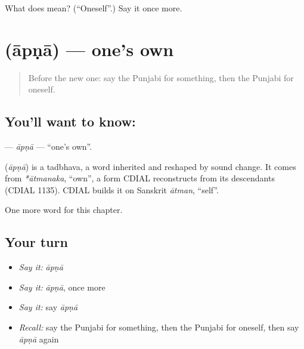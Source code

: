 \begin{tcolorbox}[breakable,colback=teal!4,colframe=teal!35!black,title={Before you move on}]
What does  mean? (\textquotedblleft{}Oneself\textquotedblright{}.) Say it once more.
\end{tcolorbox}
\section[\texorpdfstring{\pa{ਆਪਣਾ} (āpṇā)}{ਆਪਣਾ (āpṇā)}]{ (āpṇā) — one's own}

\label{lesson:PA-C107-apna}



\begin{quote}
Before the new one: say the Punjabi for something, then the Punjabi for oneself.
\end{quote}

\subsection*{You'll want to know: }
\textbf{} — \emph{āpṇā} — \textquotedblleft{}one's own\textquotedblright{}.

\begin{cousinweb}
\textbf{} (\emph{āpṇā}) is a tadbhava, a word inherited and reshaped by sound change. It comes from \emph{*ātmanaka}, \textquotedblleft{}own\textquotedblright{}, a form CDIAL reconstructs from its descendants (CDIAL 1135). CDIAL builds it on Sanskrit \emph{ātman}, \textquotedblleft{}self\textquotedblright{}.
\end{cousinweb}

\begin{grammarlens}[title={What you've built}]
One more word for this chapter.
\end{grammarlens}

\subsection*{Your turn}
\begin{itemize}
\raggedright
  \item \emph{Say it:} \emph{āpṇā}
  \item \emph{Say it:} \emph{āpṇā}, once more
  \item \emph{Say it:} say \emph{āpṇā}
  \item \emph{Recall:} say the Punjabi for something, then the Punjabi for oneself, then say \emph{āpṇā} again
\end{itemize}

